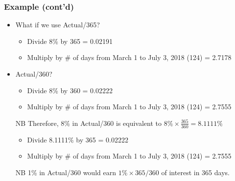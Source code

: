 \documentclass[10pt]{beamer}
\begin{document}
	\begin{frame}
		\frametitle{Example (cont'd)}
		
		\begin{itemize}
			\item What if we use Actual/365?
			\begin{itemize}
				\item Divide 8\% by 365 = 0.02191
				\item Multiply by \# of days from March 1 to July 3, 2018 (124) = 2.7178
			\end{itemize}
			
			\item Actual/360?
			\begin{itemize}
				\item Divide 8\% by 360 = 0.02222
				\item Multiply by \# of days from March 1 to July 3, 2018 (124) = 2.7555
			\end{itemize} \vspace{10pt}
			
			\item[NB] Therefore, 8\% in Actual/360 is equivalent to $8\% \times \frac{365}{360} = 8.1111\% $
			\begin{itemize}
				\item Divide 8.1111\% by 365 = 0.02222
				\item Multiply by \# of days from March 1 to July 3, 2018 (124) = 2.7555
			\end{itemize}	\vspace{10pt}
			
			\item[NB] 1\% in Actual/360 would earn $1\% \times 365/360$ of interest in 365 days.
			
			
		\end{itemize}		
		
	\end{frame}
	
	
	
\end{document}
